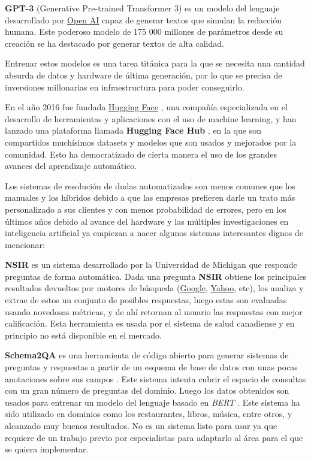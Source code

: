\textbf{GPT-3} (Generative Pre-trained Transformer 3) es un modelo del lenguaje desarrollado por \href{https://openai.com/}{Open AI} capaz de generar textos que simulan la redacción humana. Este poderoso modelo de 175 000 millones de parámetros desde su creación se ha destacado por generar textos de alta calidad.
\newline

Entrenar estos modelos es una tarea titánica para la que se necesita una cantidad absurda de datos y hardware de última generación, por lo que se precisa de inversiones millonarias en infraestructura para poder conseguirlo.
\newline

En el año 2016 fue fundada \href{https://huggingface.co/}{Hugging Face} \cite{hugging_face}, una compañía especializada en el desarrollo de herramientas y aplicaciones con el uso de machine learning, y han lanzado una plataforma llamada \textbf{Hugging Face Hub} \cite{hugging_face_hub}, en la que son compartidos muchísimos datasets y modelos que son usados y mejorados por la comunidad. Esto ha democratizado de cierta manera el uso de los grandes avances del aprendizaje automático.
\newline

Los sistemas de resolución de dudas automatizados son menos comunes que los manuales y los híbridos debido a que las empresas prefieren darle un trato más personalizado a sus clientes y con menos probabilidad de errores, pero en los últimos años debido al avance del hardware y las múltiples investigaciones en inteligencia artificial ya empiezan a nacer algunos sistemas interesantes dignos de mencionar:
\newline

\textbf{NSIR} \cite{nsir} es un sistema desarrollado por la Universidad de Michigan que responde preguntas de forma automática. Dada una pregunta \textbf{NSIR} obtiene los principales resultados devueltos por motores de búsqueda (\href{google.com}{Google}, \href{yahoo.com}{Yahoo}, etc), los analiza y extrae de estos un conjunto de posibles respuestas, luego estas son evaluadas usando novedosas métricas, y de ahí retornan al usuario las respuestas con mejor calificación. Esta herramienta es usada por el sistema de salud canadiense y en principio no está disponible en el mercado.
\newline

\textbf{Schema2QA} \cite{s2qa} es una herramienta de código abierto para generar sistemas de preguntas y respuestas a partir de un esquema de base de datos con unas pocas anotaciones sobre sus campos \cite{s2qa}. Este sistema intenta cubrir el espacio de consultas con un gran número de preguntas del dominio. Luego los datos obtenidos son usados para entrenar un modelo del lenguaje basado en \textit{BERT} \cite{bert}. Este sistema ha sido utilizado en dominios como los restaurantes, libros, música, entre otros, y alcanzado muy buenos resultados. No es un sistema listo para usar ya que requiere de un trabajo previo por especialistas para adaptarlo al área para el que se quiera implementar.
\newline


